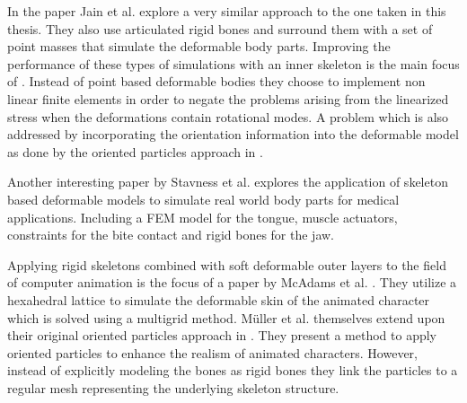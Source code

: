In the paper \cite{Jain:2011hb} Jain et al. explore a very similar approach to the one taken in this thesis. They also use articulated rigid bones and surround them with a set of point masses that simulate the deformable body parts. Improving the performance of these types of simulations with an inner skeleton is the main focus of \cite{Kim:2011iq}. Instead of point based deformable bodies they choose to implement non linear finite elements in order to negate the problems arising from the linearized stress when the deformations contain rotational modes. A problem which is also addressed by incorporating the orientation information into the deformable model as done by the oriented particles approach in \cite{Muller:2011gn}. 

Another interesting paper by Stavness et al. \cite{Stavness:2011fn} explores the application of skeleton based deformable models to simulate real world body parts for medical applications. Including a FEM model for the tongue, muscle actuators, constraints for the bite contact and rigid bones for the jaw.

Applying rigid skeletons combined with soft deformable outer layers to the field of computer animation is the focus of a paper by McAdams et al. \cite{McAdams:2011ht}. They utilize a hexahedral lattice to simulate the deformable skin of the animated character which is solved using a multigrid method. M{\"u}ller et al. themselves extend upon their original oriented particles approach in \cite{Muller:2011vu}. They present a method to apply oriented particles to enhance the realism of animated characters. However, instead of explicitly modeling the bones as rigid bones they link the particles to a regular mesh representing the underlying skeleton structure.